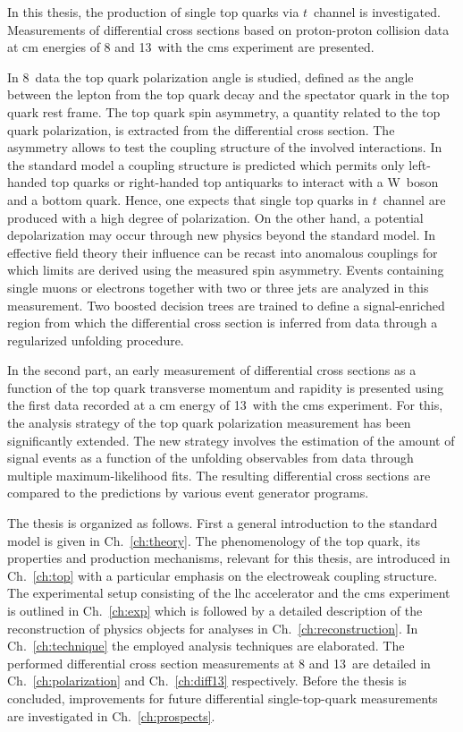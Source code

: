 In this thesis, the production of single top quarks via $t$~channel is investigated.  Measurements of differential cross sections based on proton-proton collision data at \acrlong{cm} energies of 8 and 13~\TeV with the \gls{cms} experiment are presented. 

In 8~\TeV data the top quark polarization angle is studied, defined as the angle between the lepton from the top quark decay and the spectator quark in the top quark rest frame. The top quark spin asymmetry, a quantity related to the top quark polarization, is extracted from the differential cross section. The asymmetry allows to test the coupling structure of the involved interactions. In the standard model a  coupling structure is predicted which permits only left-handed top quarks or right-handed top antiquarks to interact with a W~boson and a bottom quark. Hence, one expects that single top quarks in $t$~channel are produced with a high degree of polarization. On the other hand, a potential depolarization may occur through new physics beyond the standard model. In effective field theory their influence can be recast into anomalous couplings for which limits are derived using the measured spin asymmetry. Events containing single muons or electrons together with two or three jets are analyzed in this measurement. Two boosted decision trees are trained to define a signal-enriched region from which the differential cross section is inferred from data through a regularized unfolding procedure.

In the second part, an early measurement of differential cross sections as a function of the top quark transverse momentum and rapidity is presented using the first data recorded at a \acrlong{cm} energy of 13~\TeV with the \gls{cms} experiment. For this, the analysis strategy of the top quark polarization measurement has been significantly extended. The new strategy involves the estimation of the amount of signal events as a function of the unfolding observables from data through multiple maximum-likelihood fits. The resulting differential cross sections are compared to the predictions by various event generator programs.

The thesis is organized as follows. First a general introduction to the standard model is given in Ch.~\ref{ch:theory}. The phenomenology of the top quark, its properties and production mechanisms, relevant for this thesis, are introduced in Ch.~\ref{ch:top} with a particular emphasis on the electroweak coupling structure. The experimental setup consisting of the \gls{lhc} accelerator and the \gls{cms} experiment is outlined in Ch.~\ref{ch:exp} which is followed by a detailed description of the reconstruction of physics objects for analyses in Ch.~\ref{ch:reconstruction}. In Ch.~\ref{ch:technique} the employed analysis techniques are elaborated. The performed differential cross section measurements at 8 and 13~\TeV are detailed in Ch.~\ref{ch:polarization} and Ch.~\ref{ch:diff13} respectively. Before the thesis is concluded, improvements for future differential single-top-quark measurements are investigated in Ch.~\ref{ch:prospects}.


